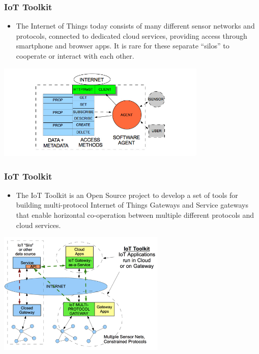 \documentclass{beamer}
\begin{document}
\begin{frame}
	\frametitle{IoT Toolkit}
	\vspace{.1cm}
	\begin{itemize}
		\item The Internet of Things today consists of many different sensor networks and protocols, connected to dedicated cloud services, providing access through smartphone and browser apps. It is rare for these separate ``silos'' to cooperate or interact with each other.	
	\end{itemize}
	\vspace{.5cm}
	\hspace*{2cm} \includegraphics[width=10cm]{figs/iot-toolkit-2.jpg}
\end{frame}

\begin{frame}
	\frametitle{IoT Toolkit}
	\begin{itemize}
		\item The IoT Toolkit is an Open Source project to develop a set of tools for building multi-protocol Internet of Things Gateways and Service gateways that enable horizontal co-operation between multiple different protocols and cloud services.
	\end{itemize}
	\vspace{.1cm}
	\hspace*{3cm} \includegraphics[width=8cm]{figs/iot-toolkit-1.png}
\end{frame}
\end{document}
